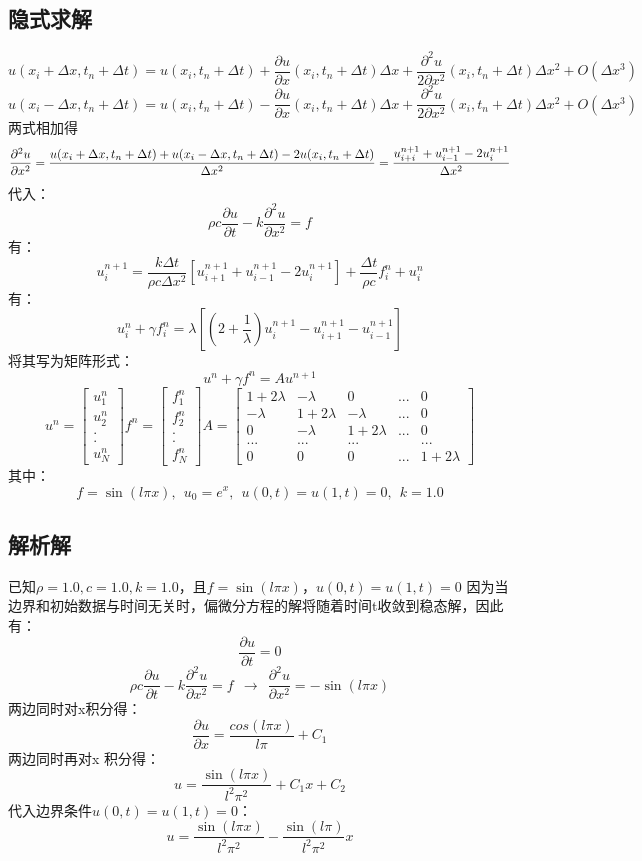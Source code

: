 \documentclass[10pt, a4paper]{article}
\begin{document}
\subsection{隐式求解}
$$u(x_i+\Delta x,t_n+\Delta t)=u(x_i,t_n+\Delta t)+\frac{\partial u}{\partial x}(x_i,t_n+\Delta t)\Delta x+\frac{\partial^2 u}{2\partial x^2}(x_i,t_n+\Delta t)\Delta x^2+O(\Delta x^3)$$
$$u(x_i-\Delta x,t_n+\Delta t)=u(x_i,t_n+\Delta t)-\frac{\partial u}{\partial x}(x_i,t_n+\Delta t)\Delta x+\frac{\partial^2 u}{2\partial x^2}(x_i,t_n+\Delta t)\Delta x^2+O(\Delta x^3)$$
两式相加得
$$
\frac{\partial ^2u}{\partial x^2}=\frac{u(x_i+\Delta x,t_n+\Delta t)+u(x_i-\Delta x,t_n+\Delta t)-2u(x_i,t_n+\Delta t)}{\Delta x^2}\\
=\frac{u_{i+i}^{n+1}+u_{i-1}^{n+1}-2u_{i}^{n+1}}{\Delta x^2}$$
代入：
$$
\rho c\frac{\partial u}{\partial t}-k\frac{\partial ^2u}{\partial x^2}=f
$$
有：
$$
u_i^{n+1}=\frac{k\Delta t}{\rho c\Delta x^2}\left [
u^{n+1}_{i+1}+u^{n+1}_{i-1}-2u_i^{n+1}
\right]+\frac{\Delta t}{\rho c}f^n_i+u_i^n
$$
有：
$$
u^n_i+\gamma f_i^n=\lambda \left[
(2+\frac{1}{\lambda})u_i^{n+1}-u^{n+1}_{i+1}-u^{n+1}_{i-1}
\right]
$$
将其写为矩阵形式：
$$
u^{n}+\gamma f^n=Au^{n+1}
$$
$$
u^n=\begin{bmatrix}
u_1^n\\u^n_2\\.\\.\\u^n_N
\end{bmatrix}
f^n=\begin{bmatrix}
f_1^n\\f^n_2\\.\\.\\f^n_N
\end{bmatrix}
A=\begin{bmatrix}
1+2\lambda&-\lambda&0&...&0\\
-\lambda&1+2\lambda&-\lambda&...&0\\
0&-\lambda&1+2\lambda&...&0\\
...&...&...&&...\\
0&0&0&...&1+2\lambda
\end{bmatrix}
$$
其中：
$$
f=\sin(l\pi x),~~u_0=e^x,~~u(0,t)=u(1,t)=0,~~k=1.0
$$
\subsection{解析解}
已知$\rho=1.0,c=1.0,k=1.0$，且$f=\sin(l\pi x)$，$u(0,t)=u(1,t)=0$ 
因为当边界和初始数据与时间无关时，偏微分方程的解将随着时间t收敛到稳态解，因此有：
$$
\frac{\partial u}{\partial t}=0
$$
$$
\rho c\frac{\partial u}{\partial t}-k\frac{\partial ^2u}{\partial x^2}=f ~~\rightarrow ~~\frac{\partial ^2u}{\partial x^2}=-\sin(l\pi x)
$$
两边同时对x积分得：
$$
\frac{\partial u}{\partial x}=\frac{cos(l\pi x)}{l\pi}+C_1
$$
两边同时再对x 积分得：
$$
u=\frac{\sin(l\pi x)}{l^2\pi ^2}+C_1x+C_2
$$
代入边界条件$u(0,t)=u(1,t)=0$：
$$
u=\frac{\sin(l\pi x)}{l^2\pi ^2}-\frac{\sin(l\pi)}{l^2\pi ^2}x
$$
\clearpage
\end{document}
